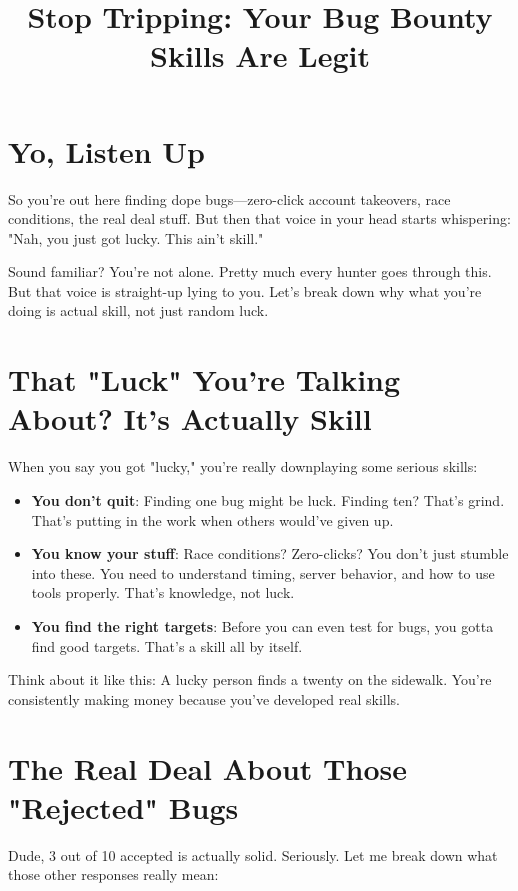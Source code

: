 \documentclass[11pt]{article}
\title{\color{lightaccent}\Huge Stop Tripping: Your Bug Bounty Skills Are Legit}
\author{}
\date{\vspace{-5ex}}
\begin{document}
\maketitle

\section*{Yo, Listen Up}

So you're out here finding dope bugs—zero-click account takeovers, race conditions, the real deal stuff. But then that voice in your head starts whispering: "Nah, you just got lucky. This ain't skill."

Sound familiar? You're not alone. Pretty much every hunter goes through this. But that voice is straight-up lying to you. Let's break down why what you're doing is actual skill, not just random luck.

\section{That "Luck" You're Talking About? It's Actually Skill}

When you say you got "lucky," you're really downplaying some serious skills:

\begin{itemize}
\item \textbf{You don't quit}: Finding one bug might be luck. Finding ten? That's grind. That's putting in the work when others would've given up.

\item \textbf{You know your stuff}: Race conditions? Zero-clicks? You don't just stumble into these. You need to understand timing, server behavior, and how to use tools properly. That's knowledge, not luck.

\item \textbf{You find the right targets}: Before you can even test for bugs, you gotta find good targets. That's a skill all by itself.
\end{itemize}

Think about it like this: A lucky person finds a twenty on the sidewalk. You're consistently making money because you've developed real skills.

\section{The Real Deal About Those "Rejected" Bugs}

Dude, 3 out of 10 accepted is actually solid. Seriously. Let me break down what those other responses really mean:
\end{document}
